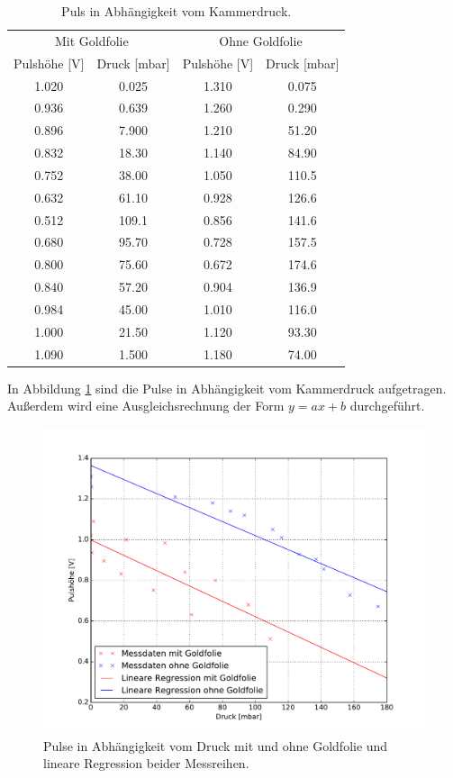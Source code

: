 \begin{table}[H]
  \centering
  \begin{tabular}{cc|cc}
    \toprule
    \multicolumn{2}{c}{Mit Goldfolie} & \multicolumn{2}{c}{Ohne Goldfolie} \\
    Pulshöhe [V] & Druck [mbar] & Pulshöhe [V] & Druck [mbar] \\
    \midrule
    1.020 & 0.025 & 1.310 & 0.075 \\
    0.936 & 0.639 & 1.260 & 0.290 \\
    0.896 & 7.900 & 1.210 & 51.20 \\
    0.832 & 18.30 & 1.140 & 84.90 \\
    0.752 & 38.00 & 1.050 & 110.5 \\
    0.632 & 61.10 & 0.928 & 126.6 \\
    0.512 & 109.1 & 0.856 & 141.6 \\
    0.680 & 95.70 & 0.728 & 157.5 \\
    0.800 & 75.60 & 0.672 & 174.6 \\
    0.840 & 57.20 & 0.904 & 136.9 \\
    0.984 & 45.00 & 1.010 & 116.0 \\
    1.000 & 21.50 & 1.120 & 93.30 \\
    1.090 & 1.500 & 1.180 & 74.00 \\
    \bottomrule
  \end{tabular}
  \caption{Puls in Abhängigkeit vom Kammerdruck.}
  \label{tab:U(p)}
\end{table}

In Abbildung \ref{fig:U(p)} sind die Pulse in Abhängigkeit vom Kammerdruck aufgetragen.
Außerdem wird eine Ausgleichsrechnung der Form $y=ax+b$ durchgeführt.

\begin{figure}[H]
  \centering
  \includegraphics[width=\textwidth]{pulshohe_druck2.pdf}
  \caption{Pulse in Abhängigkeit vom Druck mit und ohne Goldfolie und lineare Regression beider Messreihen.}
  \label{fig:U(p)}
\end{figure}

